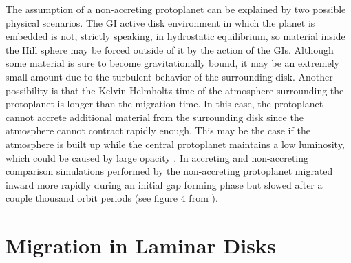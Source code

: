 The assumption of a non-accreting protoplanet can be explained by two possible physical scenarios. The GI active disk environment in which the planet is embedded is not, strictly speaking, in hydrostatic equilibrium, so material inside the Hill sphere may be forced outside of it by the action of the GIs. Although some material is sure to become gravitationally bound, it may be an extremely small amount due to the turbulent behavior of the surrounding disk. Another possibility is that the Kelvin-Helmholtz time of the atmosphere surrounding the protoplanet is longer than the migration time. In this case, the protoplanet cannot accrete additional material from the surrounding disk since the atmosphere cannot contract rapidly enough. This may be the case if the atmosphere is built up while the central protoplanet maintains a low luminosity, which could be caused by large opacity \citep{hub2005}. In accreting and non-accreting comparison simulations performed by \citet{nelson2000b} the non-accreting protoplanet migrated inward more rapidly during an initial gap forming phase but slowed after a couple thousand orbit periods (see figure 4 from \citet{nelson2000b}). 

\section{Migration in Laminar Disks}\label{sec:PL:laminar}

